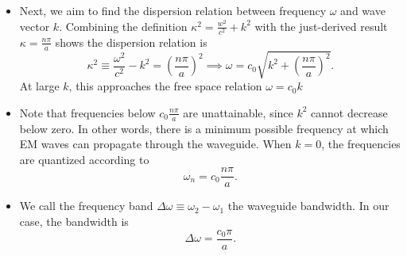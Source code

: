 \documentclass[11pt, a4paper]{article}
\begin{document}
\begin{itemize}
	\item Next, we aim to find the dispersion relation between frequency $ \omega $ and wave vector $ k $. Combining the definition $ \kappa^{2} = \frac{w^{2}}{c^{2}} + k^{2} $ with the just-derived result $ \kappa = \frac{n\pi}{a} $ shows the dispersion relation is
	\begin{equation*}
		\kappa^{2} \equiv \frac{\omega^{2}}{c^{2}} - k^{2} = \left(\frac{n\pi}{a}\right)^{2} \implies \omega = c_{0}\sqrt{k^{2} + \left(\frac{n\pi}{a}\right)^{2}}.
	\end{equation*}
	At large $ k $, this approaches the free space relation $ \omega = c_{0}k $
	
	\item Note that frequencies below $ c_{0}\frac{n\pi}{a} $ are unattainable, since $ k^{2} $ cannot decrease below zero. In other words, there is a minimum possible frequency at which EM waves can propagate through the waveguide. When $ k = 0 $, the frequencies are quantized according to
	\begin{equation*}
		\omega_{n} = c_{0}\frac{n\pi}{a}.
	\end{equation*}
	
	\item We call the frequency band $ \Delta \omega \equiv \omega_{2} - \omega_{1} $ the waveguide bandwidth. In our case, the bandwidth is
	\begin{equation*}
		\Delta \omega = \frac{c_{0}\pi}{a}.
	\end{equation*}
\end{itemize}
\end{document}
